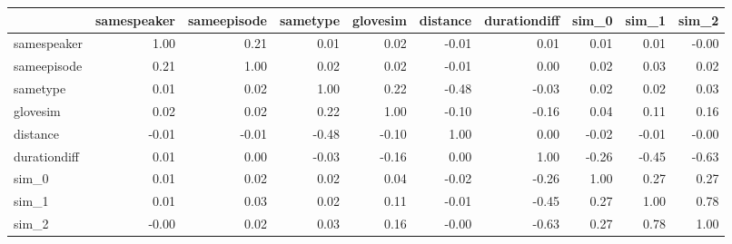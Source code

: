 \begin{tabular}{lrrrrrrrrr}
\toprule
{} &  samespeaker &  sameepisode &  sametype &  glovesim &  distance &  durationdiff &  sim\_0 &  sim\_1 &  sim\_2 \\
\midrule
samespeaker  &         1.00 &         0.21 &      0.01 &      0.02 &     -0.01 &          0.01 &   0.01 &   0.01 &  -0.00 \\
sameepisode  &         0.21 &         1.00 &      0.02 &      0.02 &     -0.01 &          0.00 &   0.02 &   0.03 &   0.02 \\
sametype     &         0.01 &         0.02 &      1.00 &      0.22 &     -0.48 &         -0.03 &   0.02 &   0.02 &   0.03 \\
glovesim     &         0.02 &         0.02 &      0.22 &      1.00 &     -0.10 &         -0.16 &   0.04 &   0.11 &   0.16 \\
distance     &        -0.01 &        -0.01 &     -0.48 &     -0.10 &      1.00 &          0.00 &  -0.02 &  -0.01 &  -0.00 \\
durationdiff &         0.01 &         0.00 &     -0.03 &     -0.16 &      0.00 &          1.00 &  -0.26 &  -0.45 &  -0.63 \\
sim\_0        &         0.01 &         0.02 &      0.02 &      0.04 &     -0.02 &         -0.26 &   1.00 &   0.27 &   0.27 \\
sim\_1        &         0.01 &         0.03 &      0.02 &      0.11 &     -0.01 &         -0.45 &   0.27 &   1.00 &   0.78 \\
sim\_2        &        -0.00 &         0.02 &      0.03 &      0.16 &     -0.00 &         -0.63 &   0.27 &   0.78 &   1.00 \\
\bottomrule
\end{tabular}
